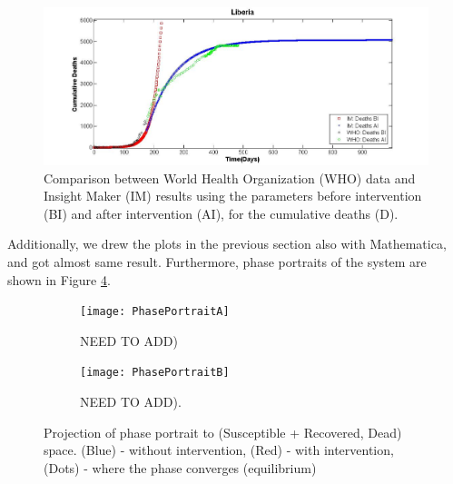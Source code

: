 \begin{figure}[!h]
  \centering
  \includegraphics[width=1\textwidth]{LB_Int2_SD_WHO_IM}
  \caption{ Comparison between World Health Organization (WHO) data and Insight Maker (IM) results using the parameters before intervention (BI) and after intervention (AI), for the cumulative deaths (D).}
\label{fig:LB_IM_WHO2} 
\end{figure}


Additionally, we drew the plots in the previous section also with Mathematica, and got almost same result. Furthermore, phase portraits of the system are shown in Figure \ref{fig:PhasePortrait}. 



\begin{figure}[h!]
 \centering 
 \begin{subfigure}[b]{0.38\textwidth}
  \texttt{[image: PhasePortraitA]} \caption{NEED TO ADD)} \label{fig:PhasePortraitA} \end{subfigure}
 \hspace{.1cm}
\begin{subfigure}[b]{0.38\textwidth}
 \texttt{[image: PhasePortraitB]} \caption{NEED TO ADD).} \label{fiig:PhasePortraitB} \end{subfigure} 
\caption{Projection of phase portrait to (Susceptible + Recovered, Dead) space. (Blue) - without intervention, (Red) - with intervention, (Dots) - where the phase converges (equilibrium)}
\label{fig:PhasePortrait} 
\end{figure}





